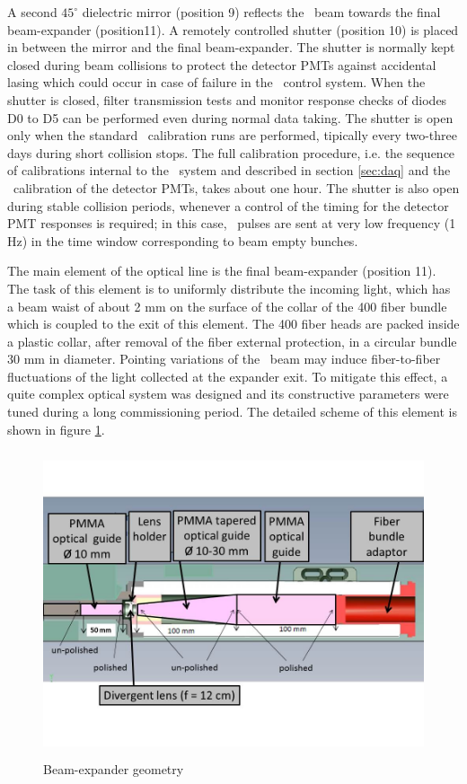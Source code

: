 A second $45^{\circ}$ dielectric mirror (position 9) reflects the \laser~beam towards
the final beam-expander (position11). A remotely controlled shutter (position 10) is
placed in between the mirror and the final beam-expander. The shutter is normally
kept closed during beam collisions to protect the detector PMTs against accidental
lasing which could occur in case of failure in the \laser~control system. When the
shutter is closed, filter transmission tests and monitor response checks of diodes
D0 to D5 can be performed even during normal data taking. The shutter is open only
when the standard \laser~calibration runs are performed, tipically every two-three
days during short collision stops. The full calibration procedure, i.e. the sequence
of calibrations internal to the \laser~system and described in section \ref{sec:daq} and the
\laser~calibration of the detector PMTs, takes about one hour. The shutter is also
open during stable collision periods, whenever a control of the timing for the
detector PMT responses is required; in this case, \laser~pulses are sent at very low
frequency (1 Hz) in the time window corresponding to
beam empty bunches. 

The main element of the optical line is the final beam-expander (position 11). The
task of this element is to uniformly distribute the incoming light, which has a
beam waist of about 2 mm on the surface of the collar of the 400 fiber bundle which
is coupled to the exit of this element. The 400 fiber heads are packed inside a
plastic collar, after removal of the fiber external protection, in a circular bundle
30 mm in diameter. Pointing variations of the \laser~beam may induce fiber-to-fiber fluctuations of the light collected at the expander exit. To mitigate this effect, a quite complex optical system was designed and its constructive parameters were tuned
during a long commissioning period.  The detailed scheme of this element is shown in
figure \ref{fig:x.4}.
% 
\begin{figure}[htb]
\begin{center} 
\includegraphics[width=13cm, height=9cm]{figures/Beam_expander}
\caption{Beam-expander geometry
}\label{fig:x.4}
\end{center}
\end{figure}
%

